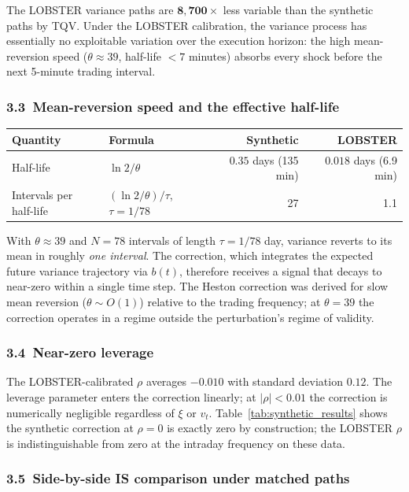 \documentclass[11pt]{article}
\begin{document}
The LOBSTER variance paths are $\mathbf{8{,}700\times}$ less variable than the synthetic paths by TQV.
Under the LOBSTER calibration, the variance process has essentially no exploitable
variation over the execution horizon: the high mean-reversion speed ($\theta \approx 39$,
half-life $< 7$ minutes) absorbs every shock before the next 5-minute trading interval.

\subsubsection*{3.3\ Mean-reversion speed and the effective half-life}

\begin{center}
\begin{tabular}{llrr}
\toprule
Quantity & Formula & Synthetic & LOBSTER \\
\midrule
Half-life & $\ln 2 / \theta$ & $0.35$ days (135 min) & $0.018$ days (6.9 min) \\
Intervals per half-life & $(\ln 2/\theta)/\tau$, $\tau = 1/78$ & 27 & 1.1 \\
\bottomrule
\end{tabular}
\end{center}

With $\theta \approx 39$ and $N = 78$ intervals of length $\tau = 1/78$ day,
variance reverts to its mean in roughly \emph{one interval}.
The correction, which integrates the expected future variance trajectory via $b(t)$,
therefore receives a signal that decays to near-zero within a single time step.
The Heston correction was derived for slow mean reversion ($\theta \sim O(1)$) relative
to the trading frequency; at $\theta = 39$ the correction operates in a regime outside
the perturbation's regime of validity.

\subsubsection*{3.4\ Near-zero leverage}

The LOBSTER-calibrated $\rho$ averages $-0.010$ with standard deviation $0.12$.
The leverage parameter enters the correction linearly; at $|\rho| < 0.01$
the correction is numerically negligible regardless of $\xi$ or $v_t$.
Table~\ref{tab:synthetic_results} shows the synthetic correction at $\rho = 0$ is
exactly zero by construction; the LOBSTER $\rho$ is indistinguishable from zero at the
intraday frequency on these data.

\subsubsection*{3.5\ Side-by-side IS comparison under matched paths}
\end{document}
